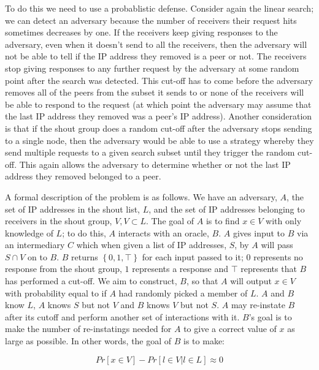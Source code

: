 \documentclass[ %
                    author={Luke Murray},
                supervisor={Dr. Simon Hollis},
                     title={Shadow Peer-to-Peer Networks},
                  subtitle={},
                    degree={MEng},
                      year={2013} ]{thesis}
\begin{document}
To do this we need to use a probablistic defense. Consider again the linear search; we can detect an adversary because the number of receivers their request hits sometimes decreases by one. If the receivers keep giving responses to the adversary, even when it doesn't send to all the receivers, then the adversary will not be able to tell if the IP address they removed is a peer or not. The receivers stop giving responses to any further request by the adversary at some random point after the search was detected. This cut-off has to come before the adversary removes all of the peers from the subset it sends to or none of the receivers will be able to respond to the request (at which point the adversary may assume that the last IP address they removed was a peer's IP address). Another consideration is that if the shout group does a random cut-off after the adversary stops sending to a single node, then the adversary would be able to use a strategy whereby they send multiple requests to a given search subset until they trigger the random cut-off. This again allows the adversary to determine whether or not the last IP address they removed belonged to a peer.

A formal description of the problem is as follows. We have an adversary, $A$, the set of IP addresses in the shout list, $L$, and the set of IP addresses belonging to receivers in the shout group, $V, V \subset L$. The goal of $A$ is to find $x \in V$ with only knowledge of $L$; to do this, $A$ interacts with an oracle, $B$. $A$ gives input to $B$ via an intermediary $C$ which when given a list of IP addresses, $S$, by $A$ will pass $S \cap V$ on to $B$. $B$ returns $\left\{0, 1, \top\right\}$ for each input passed to it; $0$ represents no response from the shout group, $1$ represents a response and $\top$ represents that $B$ has performed a cut-off. We aim to construct, $B$, so that $A$ will output $x \in V$ with probability equal to if $A$ had randomly picked a member of $L$. $A$ and $B$ know $L$, $A$ knows $S$ but not $V$ and $B$ knows $V$ but not $S$. $A$ may re-instate $B$ after its cutoff and perform another set of interactions with it. $B$'s goal is to make the number of re-instatings needed for $A$ to give a correct value of $x$ as large as possible. In other words, the goal of $B$ is to make:

\[Pr[x \in V] - Pr[l \in V | l \in L] \approx 0\]
\end{document}
